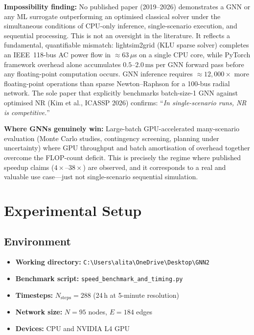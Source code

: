 \documentclass[11pt]{article}
\begin{document}
\medskip
\noindent\textbf{Impossibility finding:}
No published paper (2019--2026) demonstrates a GNN or any ML surrogate
outperforming an optimised classical solver under the simultaneous conditions
of CPU-only inference, single-scenario execution, and sequential processing.
This is not an oversight in the literature.  It reflects a fundamental,
quantifiable mismatch: lightsim2grid (KLU sparse solver) completes an
IEEE~118-bus AC power flow in ${\approx}63\,\mu$s on a single CPU core,
while PyTorch framework overhead alone accumulates $0.5$--$2.0\,\text{ms}$
per GNN forward pass before any floating-point computation occurs.  GNN
inference requires ${\approx}12{,}000\times$ more floating-point operations
than sparse Newton--Raphson for a 100-bus radial network.  The sole paper
that explicitly benchmarks batch-size-1 GNN against optimised NR
(Kim et al., ICASSP 2026) confirms: ``\textit{In single-scenario runs,
NR is competitive.}''

\medskip
\noindent\textbf{Where GNNs genuinely win:}
Large-batch GPU-accelerated many-scenario evaluation (Monte Carlo studies,
contingency screening, planning under uncertainty) where GPU throughput and
batch amortisation of overhead together overcome the FLOP-count deficit.
This is precisely the regime where published speedup claims ($4\times$--$38\times$)
are observed, and it corresponds to a real and valuable use case---just not
single-scenario sequential simulation.

\section{Experimental Setup}

\subsection{Environment}

\begin{itemize}
  \item \textbf{Working directory:} \verb|C:\Users\alita\OneDrive\Desktop\GNN2|
  \item \textbf{Benchmark script:} \verb|speed_benchmark_and_timing.py|
  \item \textbf{Timesteps:} $N_{\text{steps}} = 288$ \quad (24\,h at 5-minute resolution)
  \item \textbf{Network size:} $N = 95$ nodes, $E = 184$ edges
  \item \textbf{Devices:} CPU and NVIDIA L4 GPU
\end{itemize}
\end{document}
